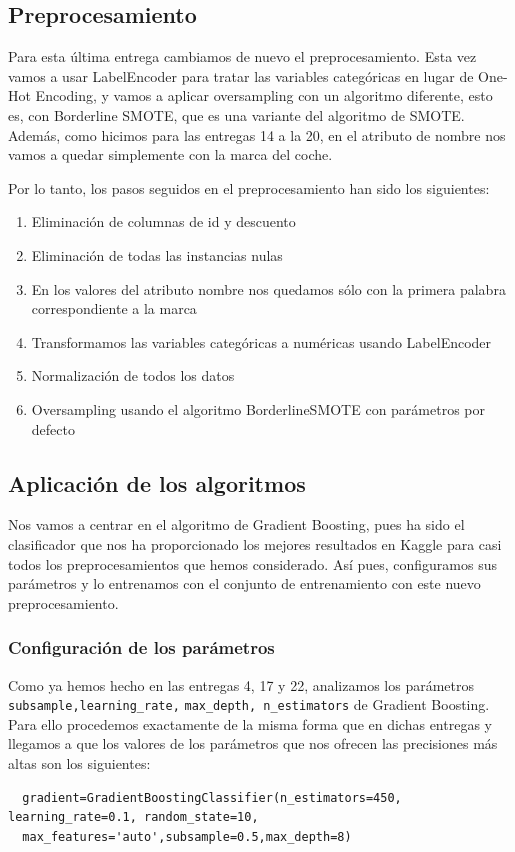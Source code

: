 \documentclass[a4paper,11pt]{article}
\begin{document}
  \subsection{Preprocesamiento}
  Para esta última entrega cambiamos de nuevo el preprocesamiento. Esta vez vamos a usar LabelEncoder para tratar las variables categóricas en lugar de One-Hot Encoding, y vamos a aplicar oversampling con un algoritmo diferente, esto es, con Borderline SMOTE, que es una variante del algoritmo de SMOTE.  Además, como hicimos para las entregas 14 a la 20, en el atributo de nombre nos vamos a quedar simplemente con la marca del coche. 
  
  Por lo tanto, los pasos seguidos en el preprocesamiento han sido los siguientes:
 \begin{enumerate}
  	\item Eliminación de columnas de id y descuento
  	\item  Eliminación de todas las instancias nulas
  	\item  En los valores del atributo nombre nos quedamos sólo con la primera palabra correspondiente a la marca
  	\item  Transformamos las variables categóricas a numéricas usando LabelEncoder
  	\item  Normalización de todos los datos
  	\item  Oversampling usando el algoritmo BorderlineSMOTE con parámetros por defecto
  \end{enumerate}
  
  \subsection{Aplicación de los algoritmos}
  Nos vamos a centrar en el algoritmo de Gradient Boosting, pues ha sido el clasificador que nos ha proporcionado los mejores resultados en Kaggle para casi todos los preprocesamientos que hemos considerado. Así pues, configuramos sus parámetros y lo entrenamos con el conjunto de entrenamiento con este nuevo preprocesamiento. 
  \subsubsection{Configuración de los parámetros}
  Como ya hemos hecho en las entregas 4, 17 y 22, analizamos los parámetros \texttt{subsample,learning_rate,} \texttt{max_depth, n_estimators} de Gradient Boosting. Para ello procedemos exactamente de la misma forma que en dichas entregas y llegamos a que los valores de los parámetros que nos ofrecen las precisiones más altas son los siguientes:
  \begin{verbatim}
  gradient=GradientBoostingClassifier(n_estimators=450, learning_rate=0.1, random_state=10,
  max_features='auto',subsample=0.5,max_depth=8)
  \end{verbatim}
  
\end{document}
